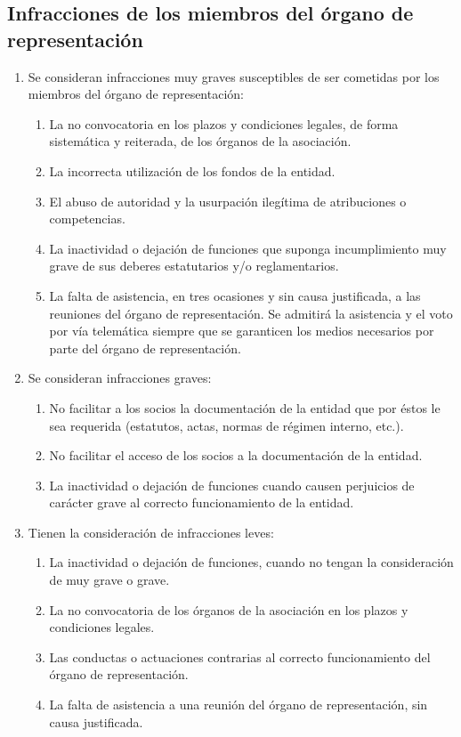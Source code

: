 \documentclass[a4paper, 12pt, oneside]{book}
\begin{document}
\subsection{Infracciones de los miembros del órgano de representación}

\begin{enumerate}
    \item Se consideran infracciones muy graves susceptibles de ser cometidas por los miembros del órgano de representación:
    \begin{enumerate}
        \item La no convocatoria en los plazos y condiciones legales, de forma sistemática y reiterada, de los órganos de la asociación.  
        \item La incorrecta utilización de los fondos de la entidad.  
        \item El abuso de autoridad y la usurpación ilegítima de atribuciones o competencias.  
        \item La inactividad o dejación de funciones que suponga incumplimiento muy grave de sus deberes estatutarios y/o reglamentarios.  
        \item La falta de asistencia, en tres ocasiones y sin causa justificada, a las reuniones del órgano de representación. Se admitirá la asistencia y el voto por vía telemática siempre que se garanticen los medios necesarios por parte del órgano de representación.
    \end{enumerate}
    \item Se consideran infracciones graves:
    \begin{enumerate}
        \item No facilitar a los socios la documentación de la entidad que por éstos le sea requerida (estatutos, actas, normas de régimen interno, etc.).  
        \item No facilitar el acceso de los socios a la documentación de la entidad.  
        \item La inactividad o dejación de funciones cuando causen perjuicios de carácter grave al correcto funcionamiento de la entidad.
    \end{enumerate}
    \item Tienen la consideración de infracciones leves:
    \begin{enumerate}
        \item La inactividad o dejación de funciones, cuando no tengan la consideración de muy grave o grave.  
        \item La no convocatoria de los órganos de la asociación en los plazos y condiciones legales. 
        \item Las conductas o actuaciones contrarias al correcto funcionamiento del órgano de representación.  
        \item La falta de asistencia a una reunión del órgano de representación, sin causa justificada.
    \end{enumerate}
\end{enumerate}
\end{document}
